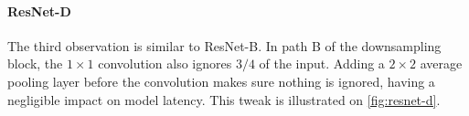 \paragraph{ResNet-D}
The third observation is similar to ResNet-B. In path B of the downsampling block, the $1 \times 1$ convolution also ignores $3/4$ of the input. Adding a $2 \times 2$ average pooling layer before the convolution makes sure nothing is ignored, having a negligible impact on model latency. This tweak is illustrated on \autoref{fig:resnet-d}.

\begin{figure}[t!]
  \centering
  \hfill%
\end{figure}
